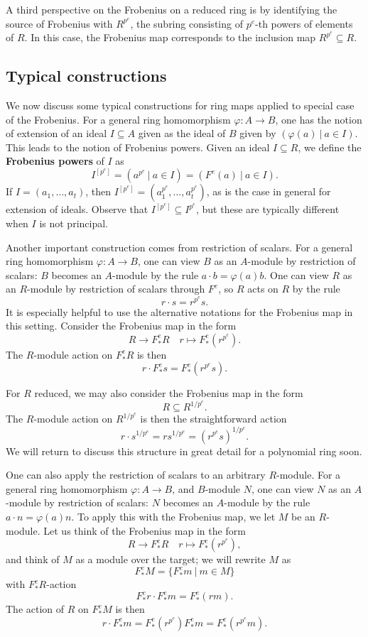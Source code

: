 \documentclass[12pt]{amsart}
\theoremstyle{definition}
\numberwithin{equation}{theorem}
\def\phi{\varphi}
\def\to{\longrightarrow}
\def\mapsto{\longmapsto}
\begin{document}
A third perspective on the Frobenius on a reduced ring is by identifying the source of Frobenius with $R^{p^e}$, the subring consisting of $p^e$-th powers of elements of $R$. In this case, the Frobenius map corresponds to the inclusion map $R^{p^e} \subseteq R$. 

\subsection*{Typical constructions}
We now discuss some typical constructions for ring maps applied to special case of the Frobenius. For a general ring homomorphism $\phi:A\to B$, one has the notion of extension of an ideal $I\subseteq A$ given as the ideal of $B$ given by $(\phi(a) \ | \ a\in I)$. This leads to the notion of Frobenius powers. Given an ideal $I\subseteq R$, we define the \textbf{Frobenius powers} of $I$ as
\[ I^{[p^e]} = ( a^{p^e} \ | \ a\in I) = (F^{e}(a) \ | \ a\in I).\]
If $I=(a_1,\dots,a_t)$, then $I^{[p^e]} = (a_1^{p^e}, \dots,a_t^{p^e})$, as is the case in general for extension of ideals. Observe that $I^{[p^e]} \subseteq I^{p^e}$, but these are typically different when $I$ is not principal.

Another important construction comes from restriction of scalars. For a general ring homomorphism $\phi:A\to B$, one can view $B$ as an $A$-module by restriction of scalars: $B$ becomes an $A$-module by the rule $a \cdot b = \phi(a)b$. One can view $R$ as an $R$-module by restriction of scalars through $F^e$, so $R$ acts on $R$ by the rule
\[ r \cdot s = r^{p^e}s.\]
It is especially helpful to use the alternative notations for the Frobenius map in this setting. Consider the Frobenius map in the form
\[ R \to F^e_*R \quad r\mapsto F^e_*(r^{p^e}).\]
The $R$-module action on $F^e_*R$ is then
\[ r \cdot F^e_*s = F^e_*(r^{p^e}s).\]

For $R$ reduced, we may also consider the Frobenius map in the form
\[ R\subseteq R^{1/p^e}.\]
The $R$-module action on $R^{1/p^e}$ is then the straightforward action
\[ r \cdot s^{1/p^e} =r s^{1/p^e} = (r^{p^e}s)^{1/p^e}.\]
We will return to discuss this structure in great detail for a polynomial ring soon.

One can also apply the restriction of scalars to an arbitrary $R$-module. For a general ring homomorphism $\phi:A\to B$, and $B$-module $N$, one can view $N$ as an $A$-module by restriction of scalars: $N$ becomes an $A$-module by the rule $a \cdot n = \phi(a)n$. To apply this with the Frobenius map, we let $M$ be an $R$-module. Let us think of the Frobenius map in the form
\[ R \to F^e_*R \quad r\mapsto F^e_*(r^{p^e}),\]
and think of $M$ as a module over the target; we will rewrite $M$ as
\[ F^e_*M =\{ F^e_*m \ | \ m\in M\}\]
with $F^e_*R$-action
\[ F^e_* r \cdot F^e_* m = F^e_* (rm).\]
The action of $R$ on $F^e_*M$ is then
\[ r \cdot F^e_*m = F^e_*(r^{p^e}) F^e_*m = F^e_*(r^{p^e}m).\]
\end{document}

